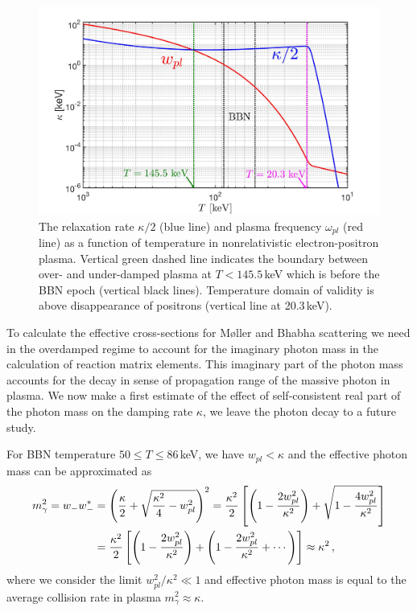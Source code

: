 \begin{figure} 
\centerline{\includegraphics[width=0.9\linewidth]{./plots/KappaElectronPhotonMass_Talk}}
\caption{The relaxation rate $\kappa/2$ (blue line) and plasma frequency $\omega_{pl}$ (red line) as a function of temperature in nonrelativistic electron-positron plasma. Vertical green dashed line indicates the boundary between over- and under-damped plasma at $T<145.5$\,keV which is before the BBN epoch (vertical black lines). Temperature domain of validity is above disappearance of positrons (vertical line at 20.3\,keV). }
\label{RelaxationRate002:fig} 
\end{figure}

To calculate the effective cross-sections for M{\o}ller and Bhabha scattering we need in the overdamped regime to account for the imaginary photon mass in the calculation of reaction matrix elements. This imaginary part of the photon mass accounts for the decay in sense of propagation range of the massive photon in plasma. We now make a first estimate of the effect of self-consistent real part of the photon mass on the damping rate $\kappa$, we leave the photon decay to a future study.

For BBN temperature $50\leqslant T\leqslant 86$\,keV,
we have $w_{pl}<\kappa$ and the effective photon mass can be approximated as
\begin{align}
m^2_\gamma=w_-w_-^\ast&=\left(\frac{\kappa}{2}+\sqrt{\frac{\kappa^2}{4}-w^2_{pl}}\right)^2
=\frac{\kappa^2}{2}\left[\left(1-\frac{2w^2_{pl}}{\kappa^2}\right)+\sqrt{1-\frac{4w^2_{pl}}{\kappa^2}}\right]\notag\\
&=\frac{\kappa^2}{2}\left[\left(1-\frac{2w^2_{pl}}{\kappa^2}\right)+\left(1-\frac{2w^2_{pl}}{\kappa^2}+\cdots\right)\right]\approx\kappa^2\,,
\label{PhotonMassPlasma002}
\end{align}
where we consider the limit $w^2_{pl}/\kappa^2\ll 1$ and effective photon mass is equal to the average collision rate in plasma $m^2_\gamma\approx\kappa$.

